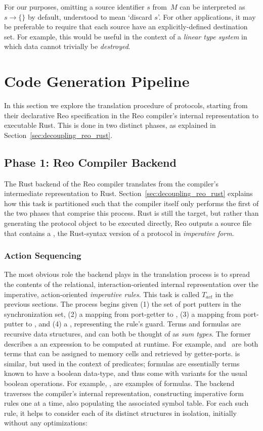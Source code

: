 For our purposes, omitting a source identifier $s$ from~$M$ can be interpreted as $s\rightarrow{}\{\}$ by default, understood to mean `discard $s$'. For other applications, it may be preferable to require that each source have an explicitly-defined destination set. For example, this would be useful in the context of a \textit{linear type system} in which data cannot trivially be \textit{destroyed}. 



\section{Code Generation Pipeline}
In this section we explore the translation procedure of protocols, starting from their declarative Reo specification in the Reo compiler's internal representation to executable Rust. This is done in two distinct phases, as explained in Section~\ref{sec:decoupling_reo_rust}. 

\subsection{Phase 1: Reo Compiler Backend}
\label{sec:translation_phase_1}
The Rust backend of the Reo compiler translates from the compiler's intermediate representation to Rust. Section~\ref{sec:decoupling_reo_rust} explains how this task is partitioned such that the compiler itself only performs the first of the two phases that comprise this process. Rust is still the target, but rather than generating the protocol object to be executed directly, Reo outputs a source file that contains a , the Rust-syntax version of a protocol in \textit{imperative form}. 


\subsubsection{Action Sequencing}
The most obvious role the backend plays in the translation process is to spread the contents of the relational, interaction-oriented internal representation over the imperative, action-oriented \textit{imperative rules}. This task is called $T_{act}$ in the previous sections. The process begins given (1) the set of port putters in the synchronization set, (2) a mapping from port-getter to , (3) a mapping from port-putter to , and (4) a , representing the rule's guard. Terms and formulas are recursive data structures, and can both be thought of as \textit{sum types}. The former describes a an expression to be computed at runtime. For example,  and~ are both terms that can be assigned to memory cells and retrieved by getter-ports.  is similar, but used in the context of predicates; formulas are essentially terms known to have a boolean data-type, and thus come with variants for the usual boolean operations. For example, ,  are examples of formulas. The backend traverses the compiler's internal representation, constructing imperative form rules one at a time, also populating the associated  symbol table. For each such rule, it helps to consider each of its distinct structures in isolation, initially without any optimizations:

